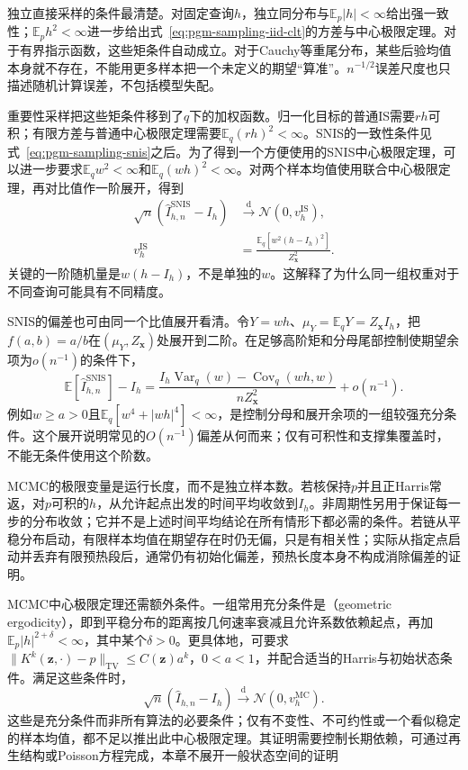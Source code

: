 独立直接采样的条件最清楚。对固定查询$h$，独立同分布与$\mathbb{E}_p|h|<\infty$给出强一致性；$\mathbb{E}_p h^2<\infty$进一步给出式~\eqref{eq:pgm-sampling-iid-clt}的方差与中心极限定理。对于有界指示函数，这些矩条件自动成立。对于Cauchy等重尾分布，某些后验均值本身就不存在，不能用更多样本把一个未定义的期望“算准”。$n^{-1/2}$误差尺度也只描述随机计算误差，不包括模型失配。

重要性采样把这些矩条件移到了$q$下的加权函数。归一化目标的普通IS需要$r h$可积；有限方差与普通中心极限定理需要$\mathbb{E}_q(rh)^2<\infty$。SNIS的一致性条件见式~\eqref{eq:pgm-sampling-snis}之后。为了得到一个方便使用的SNIS中心极限定理，可以进一步要求$\mathbb{E}_q w^2<\infty$和$\mathbb{E}_q(wh)^2<\infty$。对两个样本均值使用联合中心极限定理，再对比值作一阶展开，得到
\begin{equation}
  \begin{aligned}
    \sqrt n(\widehat I_{h,n}^{\mathrm{SNIS}}-I_h)
       &\xrightarrow{\mathrm{d}}\mathcal{N}(0,v_h^{\mathrm{IS}}),\\
    v_h^{\mathrm{IS}}
       &=\frac{\mathbb{E}_q[w^2(h-I_h)^2]}{Z_{\bm{x}}^2}.
  \end{aligned}
  \label{eq:pgm-sampling-snis-clt}
\end{equation}
关键的一阶随机量是$w(h-I_h)$，不是单独的$w$。这解释了为什么同一组权重对于不同查询可能具有不同精度。

SNIS的偏差也可由同一个比值展开看清。令$Y=wh$、$\mu_Y=\mathbb{E}_qY=Z_{\bm{x}}I_h$，把$f(a,b)=a/b$在$(\mu_Y,Z_{\bm{x}})$处展开到二阶。在足够高阶矩和分母尾部控制使期望余项为$o(n^{-1})$的条件下，
\begin{equation}
  \mathbb{E}[\widehat I_{h,n}^{\mathrm{SNIS}}]-I_h
    =\frac{I_h\operatorname{Var}_q(w)-\operatorname{Cov}_q(wh,w)}
            {n Z_{\bm{x}}^2}+o(n^{-1}).
  \label{eq:pgm-sampling-snis-bias}
\end{equation}
例如$w\geq a>0$且$\mathbb{E}_q[w^4+|wh|^4]<\infty$，是控制分母和展开余项的一组较强充分条件。这个展开说明常见的$O(n^{-1})$偏差从何而来；仅有可积性和支撑集覆盖时，不能无条件使用这个阶数。

MCMC的极限变量是运行长度，而不是独立样本数。若核保持$p$并且正Harris常返，对$p$可积的$h$，从允许起点出发的时间平均收敛到$I_h$。非周期性另用于保证每一步的分布收敛；它并不是上述时间平均结论在所有情形下都必需的条件。若链从平稳分布启动，有限样本均值在期望存在时仍无偏，只是有相关性；实际从指定点启动并丢弃有限预热段后，通常仍有初始化偏差，预热长度本身不构成消除偏差的证明。

MCMC中心极限定理还需额外条件。一组常用充分条件是（geometric ergodicity），即到平稳分布的距离按几何速率衰减且允许系数依赖起点，再加$\mathbb{E}_p|h|^{2+\delta}<\infty$，其中某个$\delta>0$。更具体地，可要求$\lVert K^k(\bm{z},\cdot)-p\rVert_{\mathrm{TV}}\leq C(\bm{z})a^k$，$0<a<1$，并配合适当的Harris与初始状态条件。满足这些条件时，
\[
  \sqrt n(\widehat I_{h,n}-I_h)
     \xrightarrow{\mathrm{d}}\mathcal{N}(0,v_h^{\mathrm{MC}}).
\]
这些是充分条件而非所有算法的必要条件；仅有不变性、不可约性或一个看似稳定的样本均值，都不足以推出此中心极限定理。其证明需要控制长期依赖，可通过再生结构或Poisson方程完成，本章不展开一般状态空间的证明

